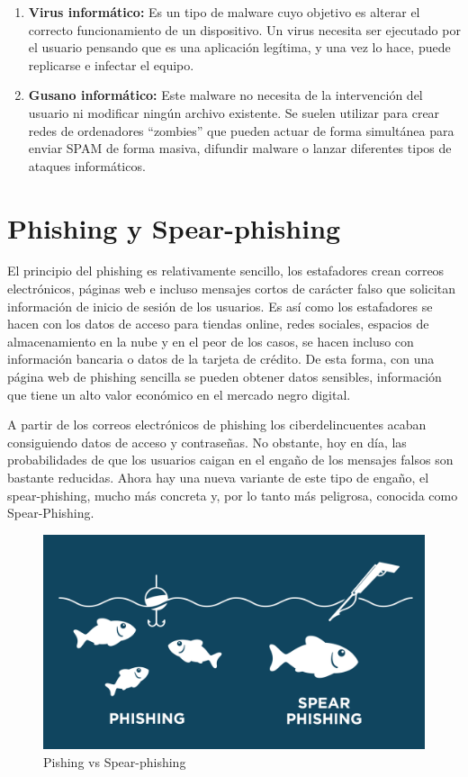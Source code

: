 \begin{enumerate}

\item {\bfseries Virus informático:} 
Es un tipo de malware cuyo objetivo es alterar el correcto funcionamiento de un dispositivo. Un virus necesita ser ejecutado por el usuario pensando que es 
una aplicación legítima, y una vez lo hace, puede replicarse e infectar el equipo.

\item {\bfseries Gusano informático:} 
Este malware no necesita de la intervención del usuario ni modificar ningún archivo existente. Se suelen utilizar para crear redes de ordenadores “zombies” 
que pueden actuar de forma simultánea para enviar SPAM de forma masiva, difundir malware o lanzar diferentes tipos de ataques informáticos.

\end{enumerate}

\section{Phishing y Spear-phishing}
\label{sec:phishing-spear-phishing}

El principio del phishing es relativamente sencillo, los estafadores crean correos electrónicos, páginas web e incluso mensajes cortos de carácter falso 
que solicitan información de inicio de sesión de los usuarios. Es así como los estafadores se hacen con los datos de acceso para tiendas online, redes 
sociales, espacios de almacenamiento en la nube y en el peor de los casos, se hacen incluso con información bancaria o datos de la tarjeta de crédito. 
De esta forma, con una página web de phishing sencilla se pueden obtener datos sensibles, información que tiene un alto valor económico en el mercado 
negro digital.

A partir de los correos electrónicos de phishing los ciberdelincuentes acaban consiguiendo datos de acceso y contraseñas. No obstante, hoy en día, las 
probabilidades de que los usuarios caigan en el engaño de los mensajes falsos son bastante reducidas. Ahora hay una nueva variante de este tipo de 
engaño, el spear-phishing, mucho más concreta y, por lo tanto más peligrosa, conocida como Spear-Phishing.

\begin{figure}[tphb]
  		   \centering
     		   \includegraphics[width=5in]{spear-phishing.png}
  		   \caption{Pishing vs Spear-phishing \cite{armor}}
  		   \label{img:spear-pishing}
\end{figure}

